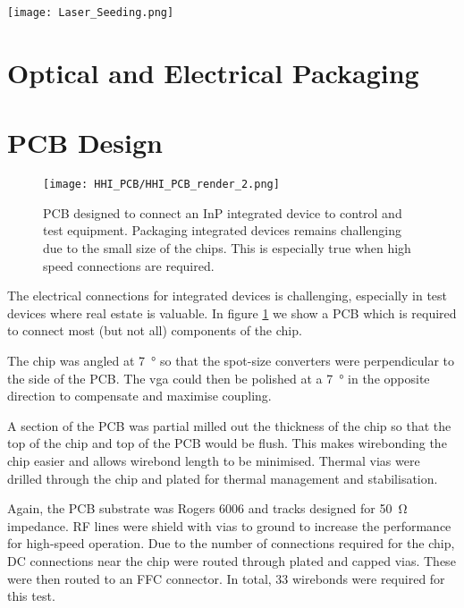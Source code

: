 \begin{sidewaysfigure}
	\centering
	\texttt{[image: Laser\_Seeding.png]}
	\caption[InP laser seeding transmitter with QRNG]{This shows the layout of the laser seeded transmitter device fabricated by HHI. The chip measures \SI[product-units=power]{6x4}{mm} and contains two laser seeding prototype circuits, a homodyne \ac{qrng} and test structure to measure laser and waveguide performances. This demonstrates the complexity and compactness possible in the integrated platform.}
	\label{fig:hhi_laser_seeding}
\end{sidewaysfigure}

\section{Optical and Electrical Packaging}

\section{PCB Design}

\begin{figure}[tbp]
	\centering
	\texttt{[image: HHI\_PCB/HHI\_PCB\_render\_2.png]}
	\caption[PCB breakout for an InP integrated circuit]{PCB designed to connect an \ac{InP} integrated device to control and test equipment. Packaging integrated devices remains challenging due to the small size of the chips. This is especially true when high speed connections are required.}
	\label{fig:hhi_pcb}
\end{figure}

The electrical connections for integrated devices is challenging, especially in test devices where real estate is valuable. In figure \ref{fig:hhi_pcb} we show a PCB which is required to connect most (but not all) components of the chip. 

The chip was angled at \SI{7}{\degree} so that the spot-size converters were perpendicular to the side of the PCB. The \ac{vga} could then be polished at a \SI{7}{\degree} in the opposite direction to compensate and maximise coupling.

A section of the PCB was partial milled out the thickness of the chip so that the top of the chip and top of the PCB would be flush. This makes wirebonding the chip easier and allows wirebond length to be minimised. Thermal vias were drilled through the chip and plated for thermal management and stabilisation. 

Again, the PCB substrate was Rogers 6006 and tracks designed for \SI{50}{\ohm} impedance. RF lines were shield with vias to ground to increase the performance for high-speed operation. Due to the number of connections required for the chip, DC connections near the chip were routed through plated and capped vias. These were then routed to an FFC connector. In total, 33 wirebonds were required for this test.

